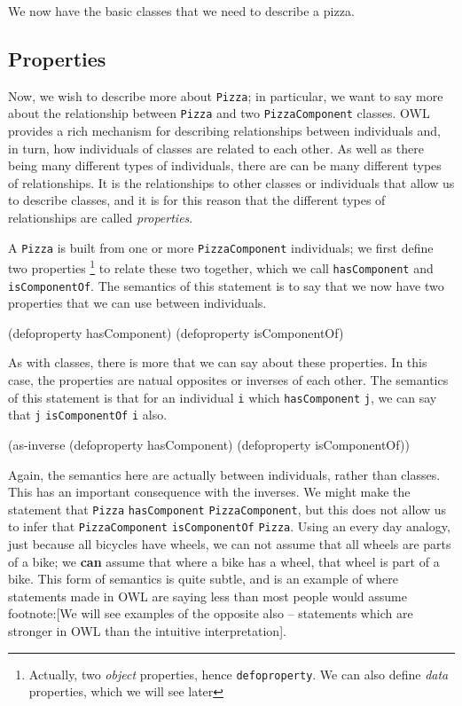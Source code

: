 \documentclass[11pt]{article}
\begin{document}
We now have the basic classes that we need to describe a pizza.


\subsection{Properties}
\label{sec-5-3}

Now, we wish to describe more about \verb~Pizza~; in particular, we want to say
more about the relationship between \verb~Pizza~ and two \verb~PizzaComponent~ classes.
OWL provides a rich mechanism for describing relationships between individuals
and, in turn, how individuals of classes are related to each other. As well as
there being many different types of individuals, there are can be many
different types of relationships. It is the relationships to other classes or
individuals that allow us to describe classes, and it is for this reason that
the different types of relationships are called \emph{properties}.

A \verb~Pizza~ is built from one or more \verb~PizzaComponent~ individuals; we first
define two properties \footnote{Actually, two \emph{object} properties, hence
\verb~defoproperty~. We can also define \emph{data} properties, which we will see later}
to relate these two together, which we call \verb~hasComponent~ and
\verb~isComponentOf~. The semantics of this statement is to say that we now have
two properties that we can use between individuals.

\begin{tawny}
(defoproperty hasComponent)
(defoproperty isComponentOf)
\end{tawny}

As with classes, there is more that we can say about these properties. In this
case, the properties are natual opposites or inverses of each other. The
semantics of this statement is that for an individual \verb~i~ which \verb~hasComponent~
\verb~j~, we can say that \verb~j~ \verb~isComponentOf~ \verb~i~ also. 

\begin{tawny}
(as-inverse
 (defoproperty hasComponent)
 (defoproperty isComponentOf))
\end{tawny}

Again, the semantics here are actually between individuals, rather than
classes. This has an important consequence with the inverses. We might make
the statement that \verb~Pizza~ \verb~hasComponent~ \verb~PizzaComponent~, but this does not
allow us to infer that \verb~PizzaComponent~ \verb~isComponentOf~ \verb~Pizza~. Using an
every day analogy, just because all bicycles have wheels, we can not assume
that all wheels are parts of a bike; we \textbf{can} assume that where a bike has a
wheel, that wheel is part of a bike. This form of semantics is quite subtle,
and is an example of where statements made in OWL are saying less than most
people would assume footnote:[We will see examples of the opposite also --
statements which are stronger in OWL than the intuitive interpretation].
\end{document}
